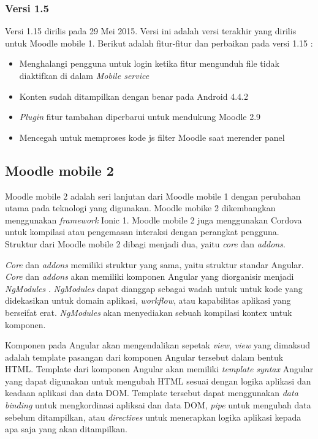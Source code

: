 \subsubsection{Versi 1.5}
Versi 1.15 dirilis pada 29 Mei 2015. Versi ini adalah versi terakhir yang dirilis untuk Moodle mobile 1. Berikut adalah fitur-fitur dan perbaikan pada versi 1.15 : \cite{Moodlemobile:version1:intro}
	\begin{itemize}
		\item Menghalangi pengguna untuk login ketika fitur mengunduh file tidak diaktifkan di dalam \textit{Mobile service}
		\item Konten sudah ditampilkan dengan benar pada Android 4.4.2
		\item \textit{Plugin} fitur tambahan diperbarui untuk mendukung Moodle 2.9
		\item Mencegah untuk memproses kode js filter Moodle saat merender panel
	\end{itemize}

\subsection{Moodle mobile 2}
Moodle mobile 2 adalah seri lanjutan dari Moodle mobile 1 dengan perubahan utama pada teknologi yang digunakan. Moodle mobike 2 dikembangkan menggunakan \textit{framework} Ionic 1. Moodle mobile 2 juga menggunakan Cordova untuk kompilasi atau pengemasan interaksi dengan perangkat pengguna. Struktur dari Moodle mobile 2 dibagi menjadi dua, yaitu \textit{core} dan \textit{addons}. 

\textit{Core} dan \textit{addons} memiliki struktur yang sama, yaitu struktur standar Angular. \textit{Core} dan \textit{addons} akan memiliki komponen Angular yang diorganisir menjadi \textit{NgModules}\cite{angular:architecture}
. \textit{NgModules} dapat dianggap sebagai wadah untuk untuk kode yang didekasikan untuk domain aplikasi, \textit{workflow}, atau kapabilitas aplikasi yang berseifat erat. \textit{NgModules} akan menyediakan sebuah kompilasi kontex untuk komponen. \cite{angular:architecture:modules}

Komponen pada Angular akan mengendalikan sepetak \textit{view}, \textit{view} yang dimaksud adalah template pasangan dari komponen Angular tersebut dalam bentuk HTML. Template dari komponen Angular akan memiliki \textit{template syntax} Angular yang dapat digunakan untuk mengubah HTML sesuai dengan logika aplikasi dan keadaan aplikasi dan data DOM. Template tersebut dapat menggunakan \textit{data binding} untuk mengkordinasi apliksai dan data DOM, \textit{pipe} untuk mengubah data sebelum ditampilkan, atau \textit{directives} untuk menerapkan logika aplikasi kepada apa saja yang akan ditampilkan. \cite{angular:architecture:components}

